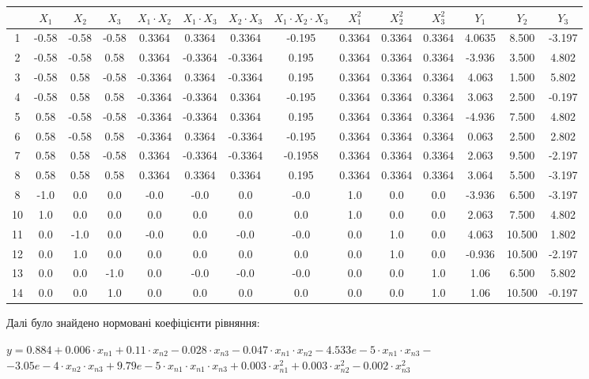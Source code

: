\begin{center}
    \tiny
    \begin{tabular}{|c|c|c|c|c|c|c|c|c|c|c|c|c|c|}
        \hline
         & $X_{1}$ & $X_{2}$ & $X_{3}$ & $X_{1}\cdot X_{2}$ & $X_{1}\cdot X_{3}$ & $X_{2}\cdot X_{3}$ &$X_{1}\cdot X_{2}\cdot X_{3}$ & $X^2_{1}$&$X^2_{2}$ &$X^2_{3}$ &$Y_{1}$ & $Y_{2}$ & $Y_{3}$ \\ 
         \hline
         1& -0.58 & -0.58 & -0.58 & 0.3364 & 0.3364 & 0.3364 & -0.195 & 0.3364 & 0.3364 & 0.3364 & 4.0635 & 8.500 & -3.197\\
         2& -0.58 & -0.58 & 0.58 & 0.3364 & -0.3364 & -0.3364 & 0.195 & 0.3364 & 0.3364 & 0.3364 & -3.936 & 3.500 & 4.802\\
         3& -0.58 & 0.58 & -0.58 & -0.3364 & 0.3364 & -0.3364 & 0.195 & 0.3364 & 0.3364 & 0.3364 & 4.063 & 1.500 & 5.802\\
         4& -0.58 & 0.58 & 0.58 & -0.3364 & -0.3364 & 0.3364 & -0.195 & 0.3364 & 0.3364 & 0.3364 & 3.063 & 2.500 & -0.197\\
         5& 0.58 & -0.58 & -0.58 & -0.3364 & -0.3364 & 0.3364 & 0.195 & 0.3364 & 0.3364 & 0.3364 & -4.936 & 7.500 & 4.802\\
         6& 0.58 & -0.58 & 0.58 & -0.3364 & 0.3364 & -0.3364 & -0.195 & 0.3364 & 0.3364 & 0.3364 & 0.063 & 2.500 & 2.802\\
         7& 0.58 & 0.58 & -0.58 & 0.3364 & -0.3364 & -0.3364 & -0.1958 & 0.3364 & 0.3364 & 0.3364 & 2.063 & 9.500 & -2.197\\
         8& 0.58 & 0.58 & 0.58 & 0.3364 & 0.3364 & 0.3364 & 0.195 & 0.3364 & 0.3364 & 0.3364 & 3.064 & 5.500 & -3.197\\
         8& -1.0 & 0.0 & 0.0 & -0.0 & -0.0 & 0.0 & -0.0 & 1.0 & 0.0 & 0.0 & -3.936 & 6.500 & -3.197\\
         10& 1.0 & 0.0 & 0.0 & 0.0 & 0.0 & 0.0 & 0.0 & 1.0 & 0.0 & 0.0 & 2.063 & 7.500 & 4.802\\
         11& 0.0 & -1.0 & 0.0 & -0.0 & 0.0 & -0.0 & -0.0 & 0.0 & 1.0 & 0.0 & 4.063 & 10.500 & 1.802\\
         12& 0.0 & 1.0 & 0.0 & 0.0 & 0.0 & 0.0 & 0.0 & 0.0 & 1.0 & 0.0 & -0.936 & 10.500 & -2.197\\
         13& 0.0 & 0.0 & -1.0 & 0.0 & -0.0 & -0.0 & -0.0 & 0.0 & 0.0 & 1.0 & 1.06 & 6.500 & 5.802\\
         14& 0.0 & 0.0 & 1.0 & 0.0 & 0.0 & 0.0 & 0.0 & 0.0 & 0.0 & 1.0 & 1.06 & 10.500 & -0.197\\
        \hline
    \end{tabular}
\end{center}
\normalsize
Далі було знайдено нормовані коефіцієнти рівняння:
\begin{center}
    $y = 0.884+0.006\cdot x_{n1}+0.11\cdot x_{n2}-0.028\cdot x_{n3}-0.047\cdot x_{n1}\cdot x_{n2}-4.533e-5\cdot x_{n1}\cdot x_{n3}-$
    $-3.05e-4\cdot x_{n2}\cdot x_{n3}+9.79e-5\cdot x_{n1}\cdot x_{n1}\cdot x_{n3}+0.003\cdot x^2_{n1}+0.003\cdot x^2_{n2}-0.002\cdot x^2_{n3}$        
\end{center}

